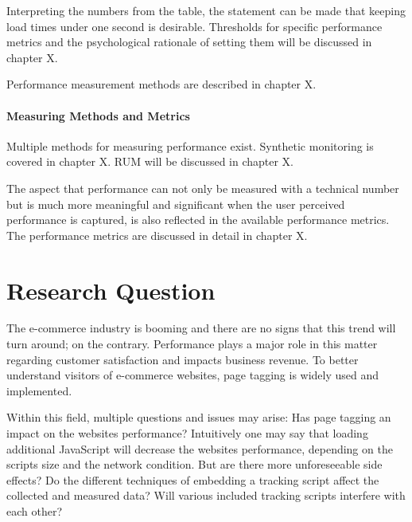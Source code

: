 Interpreting the numbers from the table, the statement can be made that keeping load times under one second is desirable.
Thresholds for specific performance metrics and the psychological rationale of setting them will be discussed in chapter X.

Performance measurement methods are described in chapter X.




\paragraph{Measuring Methods and Metrics}


Multiple methods for measuring performance exist.
Synthetic monitoring is covered in chapter X.
RUM will be discussed in chapter X.

The aspect that performance can not only be measured with a technical number but is much more meaningful and significant when the user perceived performance is captured, is also reflected in the available performance metrics.
The performance metrics are discussed in detail in chapter X.








\section{Research Question}

The e-commerce industry is booming and there are no signs that this trend will turn around; on the contrary.
Performance plays a major role in this matter regarding customer satisfaction and impacts business revenue.
To better understand visitors of e-commerce websites, page tagging is widely used and implemented.

Within this field, multiple questions and issues may arise: Has page tagging an impact on the websites performance?
Intuitively one may say that loading additional JavaScript will decrease the websites performance, depending on the scripts size and the network condition.
But are there more unforeseeable side effects? 
Do the different techniques of embedding a tracking script affect the collected and measured data?
Will various included tracking scripts interfere with each other?

